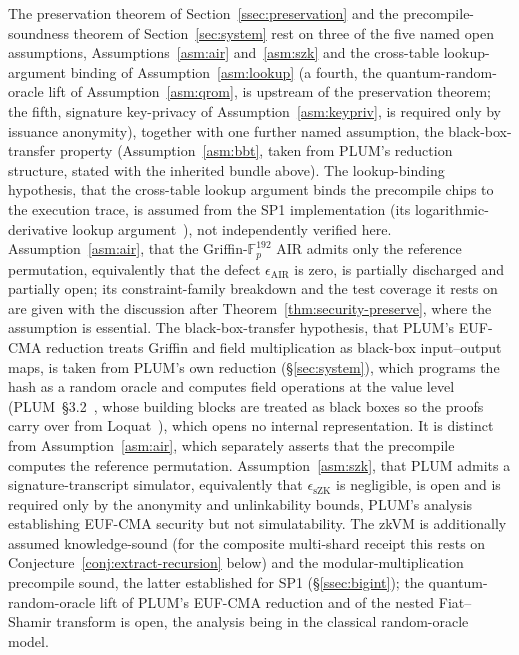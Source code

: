 The preservation theorem of Section~\ref{ssec:preservation} and the precompile-soundness theorem of Section~\ref{sec:system} rest on three of the five named open assumptions, Assumptions~\ref{asm:air} and~\ref{asm:szk} and the cross-table lookup-argument binding of Assumption~\ref{asm:lookup} (a fourth, the quantum-random-oracle lift of Assumption~\ref{asm:qrom}, is upstream of the preservation theorem; the fifth, signature key-privacy of Assumption~\ref{asm:keypriv}, is required only by issuance anonymity), together with one further named assumption, the black-box-transfer property (Assumption~\ref{asm:bbt}, taken from PLUM's reduction structure, stated with the inherited bundle above). The lookup-binding hypothesis, that the cross-table lookup argument binds the precompile chips to the execution trace, is assumed from the SP1 implementation (its logarithmic-derivative lookup argument~\cite{haback2022logup}), not independently verified here. Assumption~\ref{asm:air}, that the Griffin-$\mathbb{F}_p^{192}$ AIR admits only the reference permutation, equivalently that the defect $\epsilon_{\mathrm{AIR}}$ is zero, is partially discharged and partially open; its constraint-family breakdown and the test coverage it rests on are given with the discussion after Theorem~\ref{thm:security-preserve}, where the assumption is essential. The black-box-transfer hypothesis, that PLUM's EUF-CMA reduction treats Griffin and field multiplication as black-box input--output maps, is taken from PLUM's own reduction (\S\ref{sec:system}), which programs the hash as a random oracle and computes field operations at the value level (PLUM~\S3.2~\cite{10.1007/978-981-95-2961-2_6}, whose building blocks are treated as black boxes so the proofs carry over from Loquat~\cite{cryptoeprint:2024/868}), which opens no internal representation. It is distinct from Assumption~\ref{asm:air}, which separately asserts that the precompile computes the reference permutation. Assumption~\ref{asm:szk}, that PLUM admits a signature-transcript simulator, equivalently that $\epsilon_{\mathrm{sZK}}$ is negligible, is open and is required only by the anonymity and unlinkability bounds, PLUM's analysis establishing EUF-CMA security but not simulatability. The zkVM is additionally assumed knowledge-sound (for the composite multi-shard receipt this rests on Conjecture~\ref{conj:extract-recursion} below) and the modular-multiplication precompile sound, the latter established for SP1 (\S\ref{ssec:bigint}); the quantum-random-oracle lift of PLUM's EUF-CMA reduction and of the nested Fiat--Shamir transform is open, the analysis being in the classical random-oracle model.


